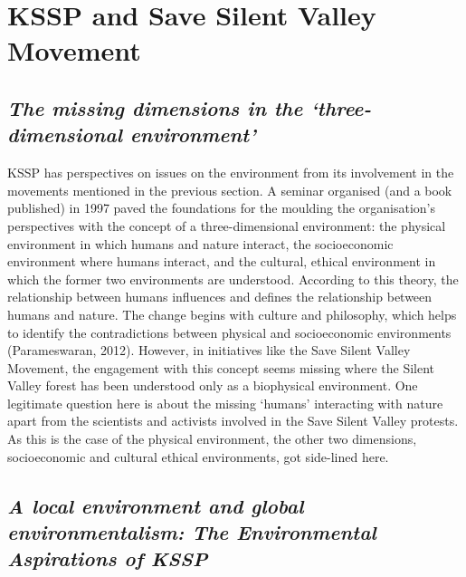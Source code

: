 \documentclass[twoside, 13pt]{article}
\begin{document}
{\vspace{.2cm}

{\fontsize{18}{20}\selectfont\section*{KSSP and Save Silent Valley Movement}}

\vspace{-.2cm}

{\fontsize{8}{10}\selectfont\subsection*{\textit{The missing dimensions in the ‘three-dimensional environment’}}

{\fontsize{12}{14}\selectfont
KSSP has perspectives on issues on the environment from its involvement in the movements mentioned in the previous section. A seminar organised (and a book published) in 1997 paved the foundations for the moulding the organisation’s perspectives with the concept of a three-dimensional environment: the physical environment in which humans and nature interact, the socioeconomic environment where humans interact, and the cultural, ethical environment in which the former two environments are understood. According to this theory, the relationship between humans influences and defines the relationship between humans and nature. The change begins with culture and philosophy, which helps to identify the contradictions between physical and socioeconomic environments (Parameswaran, 2012). However, in initiatives like the Save Silent Valley Movement, the engagement with this concept seems missing where the Silent Valley forest has been understood only as a biophysical environment. One legitimate question here is about the missing ‘humans’ interacting with nature apart from the scientists and activists involved in the Save Silent Valley protests. As this is the case of the physical environment, the other two dimensions, socioeconomic and cultural ethical environments, got side-lined here.}

\vspace{-.2cm}

{\fontsize{8}{10}\selectfont\subsection*{\textit{ A local environment and global environmentalism: The Environmental\\ Aspirations of KSSP}}

}}}
\end{document}

